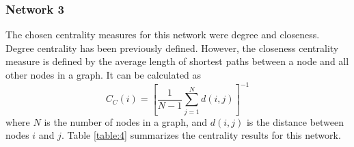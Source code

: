 \subsubsection{Network 3}
The chosen centrality measures for this network were degree and closeness. Degree centrality has been previously defined. However, the closeness centrality measure is defined by the average length of shortest paths between a node and all other nodes in a graph. It can be calculated as
\begin{equation}
    C_C(i) = \left[\frac{1}{N-1}\sum_{j=1}^{N}d(i,j)\right]^{-1}
\end{equation}
where $N$ is the number of nodes in a graph, and $d(i,j)$ is the distance between nodes $i$ and $j$. Table \ref{table:4} summarizes the centrality results for this network.
\begin{table}
    \centering
    \qquad
    \caption{Network 3 centrality}
    \label{table:4}
\end{table}

